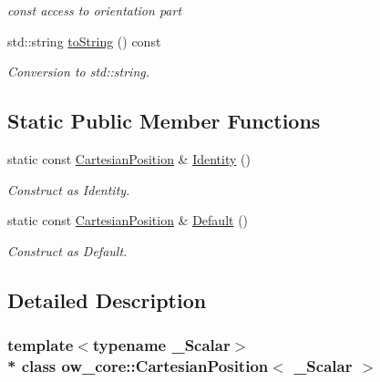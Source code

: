 \begin{DoxyCompactItemize}
\begin{DoxyCompactList}\small\item\em const access to orientation part \end{DoxyCompactList}\item 
std\+::string \hyperlink{classow__core_1_1CartesianPosition_adb579e0cf4b5dc64a276e5850fdf7d92}{to\+String} () const \hypertarget{classow__core_1_1CartesianPosition_adb579e0cf4b5dc64a276e5850fdf7d92}{}\label{classow__core_1_1CartesianPosition_adb579e0cf4b5dc64a276e5850fdf7d92}

\begin{DoxyCompactList}\small\item\em Conversion to std\+::string. \end{DoxyCompactList}\end{DoxyCompactItemize}
\subsection*{Static Public Member Functions}
\begin{DoxyCompactItemize}
\item 
static const \hyperlink{classow__core_1_1CartesianPosition}{Cartesian\+Position} \& \hyperlink{classow__core_1_1CartesianPosition_adf7c4725b0e7c01554d431f1277b7380}{Identity} ()
\begin{DoxyCompactList}\small\item\em Construct as Identity. \end{DoxyCompactList}\item 
static const \hyperlink{classow__core_1_1CartesianPosition}{Cartesian\+Position} \& \hyperlink{classow__core_1_1CartesianPosition_acd8dec83eb36d0042810e9917f9ab52f}{Default} ()
\begin{DoxyCompactList}\small\item\em Construct as Default. \end{DoxyCompactList}\end{DoxyCompactItemize}


\subsection{Detailed Description}
\subsubsection*{template$<$typename \+\_\+\+Scalar$>$\\*
class ow\+\_\+core\+::\+Cartesian\+Position$<$ \+\_\+\+Scalar $>$}

